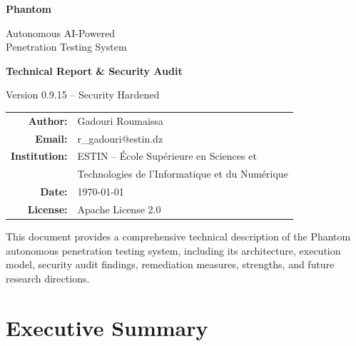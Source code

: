 \documentclass[12pt,a4paper]{article}
\begin{document}
\begin{titlepage}
\centering
\vspace*{2cm}

{\Huge\bfseries\textcolor{phantomblue}{Phantom}\par}
\vspace{0.5cm}
{\LARGE Autonomous AI-Powered\\Penetration Testing System\par}
\vspace{1.5cm}

{\Large\textbf{Technical Report \& Security Audit}\par}
\vspace{0.5cm}
{\large Version 0.9.15 -- Security Hardened\par}
\vspace{2cm}

\begin{tabular}{rl}
\textbf{Author:} & Gadouri Roumaissa \\
\textbf{Email:} & r\_gadouri@estin.dz \\
\textbf{Institution:} & ESTIN -- \'Ecole Sup\'erieure en Sciences et \\
                       & Technologies de l'Informatique et du Num\'erique \\
\textbf{Date:} & \today \\
\textbf{License:} & Apache License 2.0 \\
\end{tabular}

\vfill
{\small
This document provides a comprehensive technical description of the Phantom
autonomous penetration testing system, including its architecture, execution
model, security audit findings, remediation measures, strengths, and
future research directions.
}
\end{titlepage}

\newpage
\tableofcontents
\newpage

\section{Executive Summary}
\end{document}

